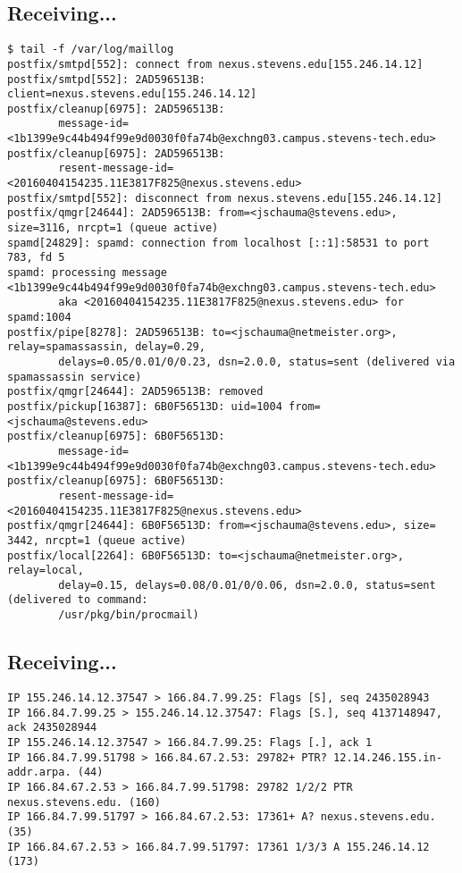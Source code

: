 \documentclass[xga]{xdvislides}
\begin{document}
\subsection{Receiving...}
\begin{verbatim}
$ tail -f /var/log/maillog
postfix/smtpd[552]: connect from nexus.stevens.edu[155.246.14.12]
postfix/smtpd[552]: 2AD596513B: client=nexus.stevens.edu[155.246.14.12]
postfix/cleanup[6975]: 2AD596513B:
        message-id=<1b1399e9c44b494f99e9d0030f0fa74b@exchng03.campus.stevens-tech.edu>
postfix/cleanup[6975]: 2AD596513B:
        resent-message-id=<20160404154235.11E3817F825@nexus.stevens.edu>
postfix/smtpd[552]: disconnect from nexus.stevens.edu[155.246.14.12]
postfix/qmgr[24644]: 2AD596513B: from=<jschauma@stevens.edu>, size=3116, nrcpt=1 (queue active)
spamd[24829]: spamd: connection from localhost [::1]:58531 to port 783, fd 5
spamd: processing message <1b1399e9c44b494f99e9d0030f0fa74b@exchng03.campus.stevens-tech.edu>
        aka <20160404154235.11E3817F825@nexus.stevens.edu> for spamd:1004
postfix/pipe[8278]: 2AD596513B: to=<jschauma@netmeister.org>, relay=spamassassin, delay=0.29,
        delays=0.05/0.01/0/0.23, dsn=2.0.0, status=sent (delivered via spamassassin service)
postfix/qmgr[24644]: 2AD596513B: removed
postfix/pickup[16387]: 6B0F56513D: uid=1004 from=<jschauma@stevens.edu>
postfix/cleanup[6975]: 6B0F56513D:
        message-id=<1b1399e9c44b494f99e9d0030f0fa74b@exchng03.campus.stevens-tech.edu>
postfix/cleanup[6975]: 6B0F56513D:
        resent-message-id=<20160404154235.11E3817F825@nexus.stevens.edu>
postfix/qmgr[24644]: 6B0F56513D: from=<jschauma@stevens.edu>, size= 3442, nrcpt=1 (queue active)
postfix/local[2264]: 6B0F56513D: to=<jschauma@netmeister.org>, relay=local,
        delay=0.15, delays=0.08/0.01/0/0.06, dsn=2.0.0, status=sent (delivered to command:
        /usr/pkg/bin/procmail)
\end{verbatim}
\Normalsize

\subsection{Receiving...}
\begin{verbatim}
IP 155.246.14.12.37547 > 166.84.7.99.25: Flags [S], seq 2435028943
IP 166.84.7.99.25 > 155.246.14.12.37547: Flags [S.], seq 4137148947, ack 2435028944
IP 155.246.14.12.37547 > 166.84.7.99.25: Flags [.], ack 1
IP 166.84.7.99.51798 > 166.84.67.2.53: 29782+ PTR? 12.14.246.155.in-addr.arpa. (44)
IP 166.84.67.2.53 > 166.84.7.99.51798: 29782 1/2/2 PTR nexus.stevens.edu. (160)
IP 166.84.7.99.51797 > 166.84.67.2.53: 17361+ A? nexus.stevens.edu. (35)
IP 166.84.67.2.53 > 166.84.7.99.51797: 17361 1/3/3 A 155.246.14.12 (173)
\end{verbatim}
\end{document}
